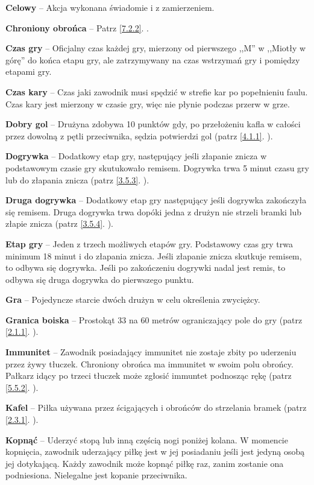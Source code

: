 \documentclass[11pt,a4paper]{article}
\newcommand{\myref}[1]{\ref{#1}. \nameref{#1}}
\begin{document}
\textbf{Celowy} -- Akcja wykonana świadomie i z zamierzeniem.

\textbf{Chroniony obrońca} -- Patrz \myref{7.2.2}.

\textbf{Czas gry} -- Oficjalny czas każdej gry, mierzony od pierwszego ,,M'' w ,,Miotły w górę'' do końca etapu gry, ale zatrzymywany na czas wstrzymań gry i pomiędzy etapami gry.

\textbf{Czas kary} -- Czas jaki zawodnik musi spędzić w strefie kar po popełnieniu faulu. Czas kary jest mierzony w czasie gry, więc nie płynie podczas przerw w grze.

\textbf{Dobry gol} -- Drużyna zdobywa 10 punktów gdy, po przełożeniu kafla w całości przez dowolną z pętli przeciwnika, sędzia potwierdzi gol (patrz \myref{4.1.1}).

\textbf{Dogrywka} -- Dodatkowy etap gry, następujący jeśli złapanie znicza w podstawowym czasie gry skutukowało remisem. Dogrywka trwa 5 minut czasu gry lub do złapania znicza (patrz \myref{3.5.3}).

\textbf{Druga dogrywka} -- Dodatkowy etap gry następujący jeśli dogrywka zakończyła się remisem. Druga dogrywka trwa dopóki jedna z drużyn nie strzeli bramki lub złapie znicza (patrz \myref{3.5.4}).

\textbf{Etap gry} -- Jeden z trzech możliwych etapów gry. Podstawowy czas gry trwa minimum 18 minut i do złapania znicza. Jeśli złapanie znicza skutkuje remisem, to odbywa się dogrywka. Jeśli po zakończeniu dogrywki nadal jest remis, to odbywa się druga dogrywka do pierwszego punktu.

\textbf{Gra} -- Pojedyncze starcie dwóch drużyn w celu określenia zwyciężcy.

\textbf{Granica boiska} -- Prostokąt 33 na 60 metrów ograniczający pole do gry (patrz \myref{2.1.1}).

\textbf{Immunitet} -- Zawodnik posiadający immunitet nie zostaje zbity po uderzeniu przez żywy tłuczek. Chroniony obrońca ma immunitet w swoim polu obrońcy. Pałkarz idący po trzeci tłuczek może zgłosić immuntet podnosząc rękę (patrz \myref{5.5.2}).

\textbf{Kafel} -- Piłka używana przez ścigających i obrońców do strzelania bramek (patrz \myref{2.3.1}).

\textbf{Kopnąć} -- Uderzyć stopą lub inną częścią nogi poniżej kolana. W momencie kopnięcia, zawodnik uderzający piłkę jest w jej posiadaniu jeśli jest jedyną osobą jej dotykającą. Każdy zawodnik może kopnąć piłkę raz, zanim zostanie ona podniesiona. Nielegalne jest kopanie przeciwnika.
\end{document}
